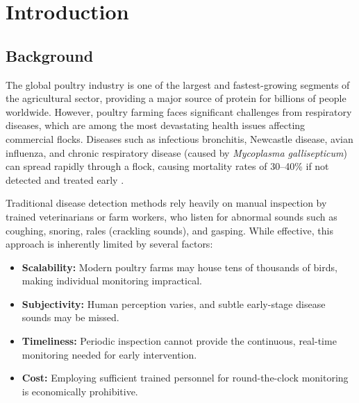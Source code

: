 \documentclass[12pt,a4paper]{report}
\begin{document}
\clearpage

\tableofcontents
\clearpage
\listoffigures
{}
\clearpage
\listoftables
{}
\clearpage

\chapter{Introduction}
\label{ch:intro}

\section{Background}

The global poultry industry is one of the largest and fastest-growing segments of the agricultural sector, providing a major source of protein for billions of people worldwide. However, poultry farming faces significant challenges from respiratory diseases, which are among the most devastating health issues affecting commercial flocks. Diseases such as infectious bronchitis, Newcastle disease, avian influenza, and chronic respiratory disease (caused by \textit{Mycoplasma gallisepticum}) can spread rapidly through a flock, causing mortality rates of 30--40\% if not detected and treated early \cite{datainbrief2023}.

Traditional disease detection methods rely heavily on manual inspection by trained veterinarians or farm workers, who listen for abnormal sounds such as coughing, snoring, rales (crackling sounds), and gasping. While effective, this approach is inherently limited by several factors:
\begin{itemize}
    \item \textbf{Scalability:} Modern poultry farms may house tens of thousands of birds, making individual monitoring impractical.
    \item \textbf{Subjectivity:} Human perception varies, and subtle early-stage disease sounds may be missed.
    \item \textbf{Timeliness:} Periodic inspection cannot provide the continuous, real-time monitoring needed for early intervention.
    \item \textbf{Cost:} Employing sufficient trained personnel for round-the-clock monitoring is economically prohibitive.
\end{itemize}
\end{document}
